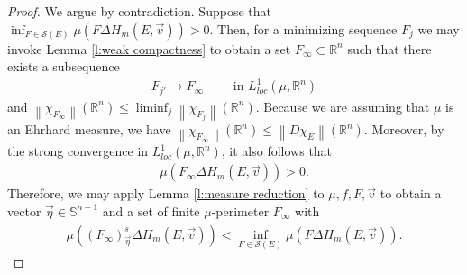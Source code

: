 \documentclass[12pt]{amsart}
\numberwithin{equation}{section}
\theoremstyle{plain}
\theoremstyle{definition}
\newcommand{\norm}[1]{\left\lVert#1\right\rVert}
\begin{document}
\begin{proof}
We argue by contradiction.  Suppose that $\inf_{F \in \mathcal{S}(E)} \mu(F \Delta H_m(E, \vec{v}))>0.
$ Then, for a minimizing sequence $F_j$ we may invoke Lemma \ref{l:weak compactness} to obtain a set $F_{\infty} \subset \mathbb{R}^n$ such that there exists a subsequence 
\begin{align*}
    F_{j'} \rightarrow F_{\infty} \qquad \text{ in } L^1_{loc}(\mu, \mathbb{R}^n)
\end{align*}
and $\norm{\chi_{F_{\infty}}}(\mathbb{R}^n) \le \liminf_{j} \norm{\chi_{F_{j}}}(\mathbb{R}^n)$. Because we are assuming that $\mu$ is an Ehrhard measure, we have $\norm{\chi_{F_{\infty}}}(\mathbb{R}^n) \le \norm{D\chi_{E}}(\mathbb{R}^n)$.  Moreover, by the strong convergence in $L^1_{loc}(\mu, \mathbb{R}^n)$, it also follows that 
\begin{align*}
    \mu(F_{\infty} \Delta H_m(E, \vec{v}))>0.
\end{align*}
Therefore, we may apply Lemma \ref{l:measure reduction} to $\mu, f, F, \vec{v}$ to obtain a vector $\vec{\eta} \in \mathbb{S}^{n-1}$ and a set of finite $\mu$-perimeter $F_{\infty}$ with
\begin{align*}
    \mu((F_{\infty})^s_{\vec{\eta}} \Delta H_m(E, \vec{v}))< \inf_{F \in \mathcal{S}(E)} \mu(F \Delta H_m(E, \vec{v})).
\end{align*}


\end{proof}
\end{document}
